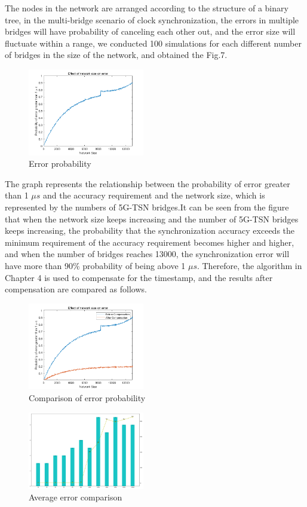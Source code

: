\documentclass[english]{cccconf}
\begin{document}
The nodes in the network are arranged according to the structure of a binary tree, in the multi-bridge scenario of clock synchronization, the errors in multiple bridges will have probability of canceling each other out, and the error size will fluctuate within a range, we conducted 100 simulations for each different number of bridges in the size of the network, and obtained the Fig.7.
\begin{figure}[htbp]
	\centering
	\setcounter{figure}{6}
	\includegraphics[width=2in]{fig18.png}
	\caption{Error probability}
\end{figure}

The graph represents the relationship between the probability of error greater than 1 $\mu s$ and the accuracy requirement and the network size, which is represented by the numbers of 5G-TSN bridges.It can be seen from the figure that when the network size keeps increasing and the number of 5G-TSN bridges keeps increasing, the probability that the synchronization accuracy exceeds the minimum requirement of the accuracy requirement becomes higher and higher, and when the number of bridges reaches 13000, the synchronization error will have more than 90\% probability of being above 1 $\mu s$. Therefore, the algorithm in Chapter 4 is used to compensate for the timestamp, and the results after compensation are compared as follows.
\begin{figure}[htbp]
	\centering
	\setcounter{figure}{6}
	\includegraphics[width=2in]{fig20.png}
	\caption{Comparison of error probability }
\end{figure}
\begin{figure}[htbp]
	\centering
	\setcounter{figure}{7}
	\includegraphics[width=2in]{fig19.png}
	\caption{Average error comparison}
\end{figure}



\end{document}

